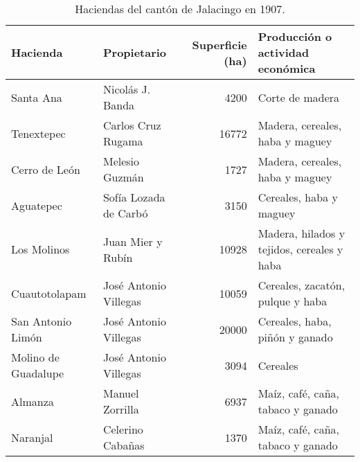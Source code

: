 \documentclass[14pt,twoside,final]{extbook} %
\begin{document}
\begin{sidewaystable}
\centering
\caption[Haciendas del cantón de Jalacingo en 1907]{Haciendas del cantón de Jalacingo en 1907.}
\begin{small}
\tlfstyle
\begin{tabular}{@{}llrl@{}}
\toprule
Hacienda & Propietario & Superficie (ha) & Producción o actividad económica \\
\midrule
Santa Ana\index[lugares]{Santa Ana!hacienda} & Nicolás J. Banda\index[nombres]{Banda, Nicolas J.@Banda, Nicolás J.} & 4200 & Corte de madera \\
Tenextepec\index[lugares]{Tenextepec!hacienda} & Carlos Cruz Rugama\index[nombres]{Cruz Rugama, Carlos} & 16772 & Madera, cereales,\textsu{*} haba y maguey \\
Cerro de León\index[lugares]{Cerro de Leon@Cerro de León!hacienda} & Melesio Guzmán\index[nombres]{Guzman, Melesio@Guzmán, Melesio} & 1727 & Madera, cereales,\textsu{*} haba y maguey \\
Aguatepec\index[lugares]{Aguatepec!hacienda} & Sofía Lozada de Carbó\index[nombres]{Lozada de Carbo, Sofía@Lozada de Carbó, Sofía} & 3150 & Cereales,\textsu{*} haba y maguey \\
Los Molinos\index[lugares]{San Jose de los Molinos@San José de los Molinos!hacienda} & Juan Mier y Rubín\index[nombres]{Mier y Rubin, Juan@Mier y Rubín, Juan} & 10928 & Madera, hilados y tejidos, cereales\textsu{*} y haba \\
Cuautotolapam\index[lugares]{Cuautotolapam!hacienda} & José Antonio Villegas\index[nombres]{Villegas Contreras, Jose Antonio@Villegas Contreras, José Antonio} & 10059 & Cereales,\textsu{*} zacatón, pulque y haba \\
San Antonio Limón\index[lugares]{San Antonio Limon@San Antonio Limón!hacienda} & José Antonio Villegas & 20000 & Cereales,\textsu{*} haba, piñón y ganado \\
Molino de Guadalupe\index[lugares]{Molino de Guadalupe!hacienda} & José Antonio Villegas & 3094 & Cereales\textsu{*} \\
Almanza\index[lugares]{Almanza!hacienda} & Manuel Zorrilla\index[nombres]{Zorrilla, Manuel} & 6937 & Maíz, café, caña, tabaco y ganado \\
Naranjal\index[lugares]{Naranjal, El!hacienda} & Celerino Cabañas\index[nombres]{Cabanas, Celerino@Cabañas, Celerino} & 1370 & Maíz, café, caña, tabaco y ganado \\

\end{tabular}
\end{small}
\end{sidewaystable}
\end{document}
